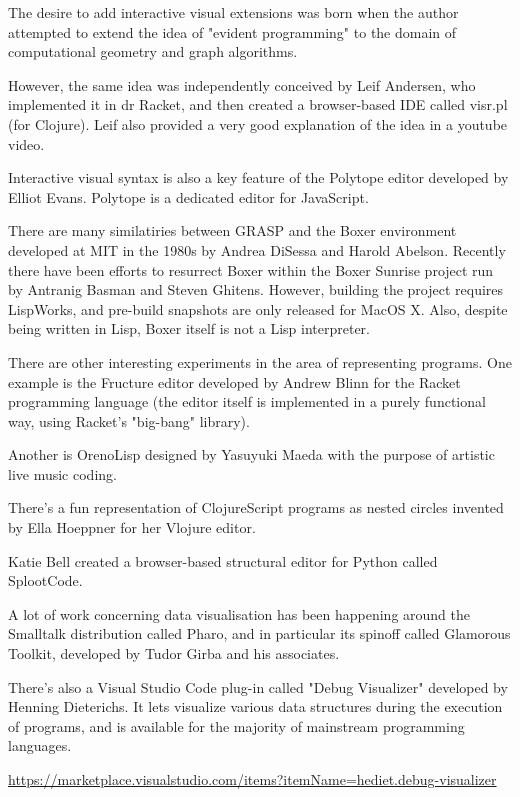 \documentclass[11pt]{article}
\begin{document}
The desire to add interactive visual extensions
was born when the author attempted to extend
the idea of "evident programming" to the domain
of computational geometry and graph algorithms.

However, the same idea was independently
conceived by Leif Andersen, who implemented
it in dr Racket, and then created a browser-based
IDE called visr.pl (for Clojure). Leif also provided
a very good explanation of the idea in a youtube video.

Interactive visual syntax is also a key feature
of the Polytope editor developed by Elliot Evans.
Polytope is a dedicated editor for JavaScript.

There are many similatiries between GRASP and
the Boxer environment developed at MIT in the 1980s
by Andrea DiSessa and Harold Abelson. Recently
there have been efforts to resurrect Boxer
within the Boxer Sunrise project run by Antranig
Basman and Steven Ghitens. However, building
the project requires LispWorks, and pre-build
snapshots are only released for MacOS X. Also,
despite being written in Lisp, Boxer itself
is not a Lisp interpreter.

There are other interesting experiments
in the area of representing programs.
One example is the Fructure editor developed
by Andrew Blinn for the Racket programming
language (the editor itself is implemented
in a purely functional way, using Racket's
"big-bang" library).

Another is OrenoLisp designed by Yasuyuki
Maeda with the purpose of artistic live
music coding.

There's a fun representation of ClojureScript
programs as nested circles invented by Ella
Hoeppner for her Vlojure editor.

Katie Bell created a browser-based structural
editor for Python called SplootCode.

A lot of work concerning data visualisation
has been happening around the Smalltalk
distribution called Pharo, and in particular
its spinoff called Glamorous Toolkit, developed
by Tudor Girba and his associates.

There's also a Visual Studio Code plug-in
called "Debug Visualizer" developed by Henning
Dieterichs. It lets visualize various data structures
during the execution of programs, and is available
for the majority of mainstream programming languages.

\url{https://marketplace.visualstudio.com/items?itemName=hediet.debug-visualizer}
\end{document}
